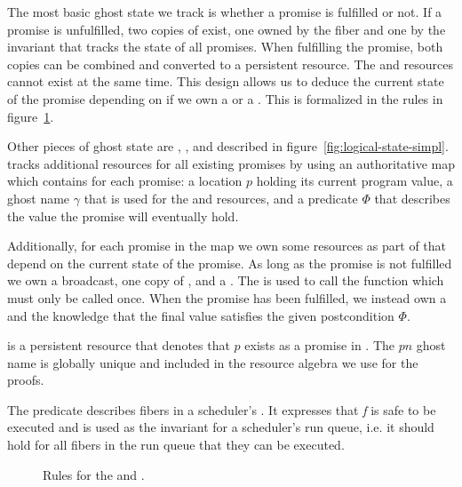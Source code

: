 The most basic ghost state we track is whether a promise is fulfilled or not.
If a promise  is unfulfilled, two copies of \gspwait{} exist, one owned by the fiber and one by the invariant that tracks the state of all promises.
When fulfilling the promise, both copies can be combined and converted to a persistent \gspdone{} resource.
The \gspwait{} and \gspdone{} resources cannot exist at the same time.
This design allows us to deduce the current state of the promise depending on if we own a \gspwait{} or a \gspdone{}.
This is formalized in the rules in figure~\ref{fig:promise-state-rules}.

Other pieces of ghost state are \gsPInvIn{}, \gsIsPr{}, and \gsReady{} described in figure~\ref{fig:logical-state-simpl}.
\gsPInvIn{} tracks additional resources for all existing promises by using an authoritative map which contains for each promise:
a location \(p\) holding its current program value, a ghost name \(\gamma\) that is used for the \gspwait{} and \gspdone{} resources, and a predicate \(Φ\) that describes the value the promise will eventually hold.

Additionally, for each promise in the map we own some resources as part of \gsPInvIn{} that depend on the current state of the promise.
As long as the promise is not fulfilled we own a broadcast, one copy of \gspwait{}, and a \gssignal{}.
The \gssignal{} is used to call the  function which must only be called once.
When the promise has been fulfilled, we instead own a \gspdone{} and the knowledge that the final value satisfies the given postcondition \(Φ\).

\gsIsPr{} is a persistent resource that denotes that \(p\) exists as a promise in \gsPInvIn{}. The \(pn\) ghost name is globally unique and included in the resource algebra we use for the proofs.

The \gsReady{} predicate describes fibers in a scheduler's .
It expresses that \textit{f} is safe to be executed and is used as the invariant for a scheduler's run queue, i.e. it should hold for all fibers in the run queue that they can be executed.

\begin{figure}
  \caption{Rules for the \gspwait{} and \gspdone{}.}
  \label{fig:promise-state-rules}
\end{figure}

